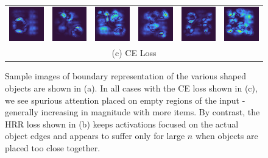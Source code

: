 \documentclass[letterpaper]{article} %
\begin{document}
\begin{figure}[!t]
\begin{tabular}{cccccc}
\multicolumn{1}{c}{\includegraphics[width=0.125\columnwidth]{saliency/ce/edges/edges_1.png}} \hspace{-12pt} &  \multicolumn{1}{c}{\includegraphics[width=0.125\columnwidth]{saliency/ce/edges/edges_2.png}} \hspace{-12pt} & \multicolumn{1}{c}{\includegraphics[width=0.125\columnwidth]{saliency/ce/edges/edges_3.png}} \hspace{-12pt} & \multicolumn{1}{c}{\includegraphics[width=0.125\columnwidth]{saliency/ce/edges/edges_4.png}} \hspace{-12pt} & \multicolumn{1}{c}{\includegraphics[width=0.125\columnwidth]{saliency/ce/edges/edges_5.png}} \hspace{-12pt} & \multicolumn{1}{c}{\includegraphics[width=0.125\columnwidth]{saliency/ce/edges/edges_6.png}} \\ 
\multicolumn{6}{c}{(c) CE Loss}
\end{tabular}
\caption{Sample images of boundary representation of the various shaped objects are shown in (a). In all cases with the CE loss shown in (c), we see spurious attention placed on empty regions of the input - generally increasing in magnitude with more items. By contrast, the HRR loss shown in (b) keeps activations focused on the actual object edges and appears to suffer only for large $n$ when objects are placed too close together.}
\label{fig:boundary_saliency}
\end{figure}
\end{document}
